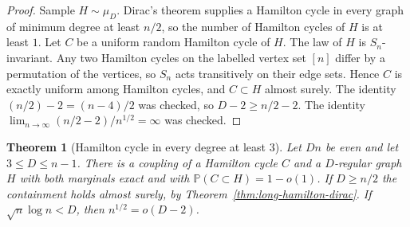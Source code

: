 \documentclass[11pt]{article}
\newtheorem{theorem}{Theorem}
\newcommand{\PP}{\mathbb{P}}
\begin{document}
\begin{proof}
Sample \(H\sim\mu_D\). Dirac's theorem supplies a Hamilton cycle in every graph of
minimum degree at least \(n/2\), so the number of Hamilton cycles of \(H\) is at
least \(1\). Let \(C\) be a uniform random Hamilton cycle of \(H\). The law of \(H\)
is \(S_n\)-invariant. Any two Hamilton cycles on the labelled vertex set \([n]\)
differ by a permutation of the vertices, so \(S_n\) acts transitively on their edge
sets. Hence \(C\) is exactly uniform among Hamilton cycles, and \(C\subset H\) almost
surely. The identity \((n/2)-2=(n-4)/2\) was checked, so \(D-2\ge n/2-2\). The
identity \(\lim_{n\to\infty}(n/2-2)/n^{1/2}=\infty\) was checked.
\end{proof}

\begin{theorem}[Hamilton cycle in every degree at least \(3\)]
\label{thm:long-hamilton-wide}
Let \(Dn\) be even and let \(3\le D\le n-1\). There is a coupling of a Hamilton
cycle \(C\) and a \(D\)-regular graph \(H\) with both marginals exact and with
\(\PP(C\subset H)=1-o(1)\). If \(D\ge n/2\) the containment holds almost surely,
by Theorem~\ref{thm:long-hamilton-dirac}. If \(\sqrt{n}\log n<D\), then
\(n^{1/2}=o(D-2)\).
\end{theorem}
\end{document}
